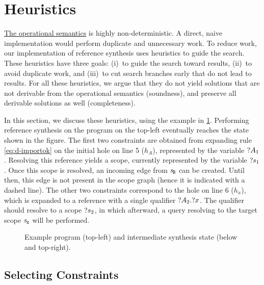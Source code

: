 \section{Heuristics}%
\label{sec:heuristics}

\hyperref[sec:operational-semantics]{The operational semantics} is highly non-deterministic.
A direct, naive implementation would perform duplicate and unnecessary work.
To reduce work, our implementation of reference synthesis uses heuristics to guide the search.
These heuristics have three goals: (i)~to guide the search toward results, (ii)~to avoid duplicate work, and (iii)~to cut search branches early that do not lead to results.
For all these heuristics, we argue that they do not yield solutions that are not derivable from the operational semantics (soundness), and preserve all derivable solutions as well (completeness).

In this section, we discuss these heuristics, using the example in \cref{fig:example-state-for-heuristics}.
Performing reference synthesis on the program on the top-left eventually reaches the state shown in the figure.
The first two constraints are obtained from expanding rule \ref{eq:d-importok} on the initial hole on line 5 ($h_A$), represented by the variable $\text{?$A_1$}$.
Resolving this reference yields a scope, currently represented by the variable $\text{?$s_1$}$.
Once this scope is resolved, an incoming edge from $\mathit{s}_{\texttt{B}}$ can be created.
Until then, this edge is not present in the scope graph (hence it is indicated with a dashed line).
The other two constraints correspond to the hole on line 6 ($h_x$), which is expanded to a reference with a single qualifier $\text{?$A_2$}\mathtt{.}\text{?$x$}$.
The qualifier should resolve to a scope $\text{?$s_2$}$, in which afterward, a query resolving to the target scope $\mathit{s}_{\texttt{x}}$ will be performed.


\begin{figure}[t]
  
  \caption{
    Example program (top-left) and intermediate synthesis state (below and top-right).
  }%
  \label{fig:example-state-for-heuristics}
\end{figure}%


\subsection{Selecting Constraints}%
\label{subsec:selecting-constraints}

